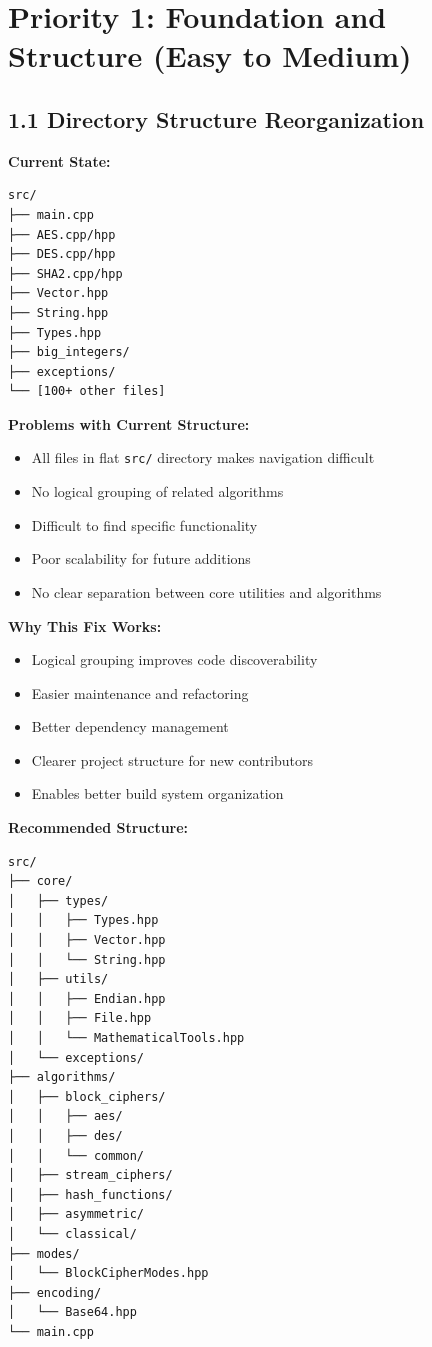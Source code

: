 \documentclass[11pt,a4paper]{article}
\begin{document}
\section{Priority 1: Foundation and Structure (Easy to Medium)}

\subsection{1.1 Directory Structure Reorganization}

\textbf{Current State:}
\begin{lstlisting}
src/
├── main.cpp
├── AES.cpp/hpp
├── DES.cpp/hpp
├── SHA2.cpp/hpp
├── Vector.hpp
├── String.hpp
├── Types.hpp
├── big_integers/
├── exceptions/
└── [100+ other files]
\end{lstlisting}

\textcolor{problemred}{\textbf{Problems with Current Structure:}}
\begin{itemize}
    \item All files in flat \texttt{src/} directory makes navigation difficult
    \item No logical grouping of related algorithms
    \item Difficult to find specific functionality
    \item Poor scalability for future additions
    \item No clear separation between core utilities and algorithms
\end{itemize}

\textcolor{solutiongreen}{\textbf{Why This Fix Works:}}
\begin{itemize}
    \item Logical grouping improves code discoverability
    \item Easier maintenance and refactoring
    \item Better dependency management
    \item Clearer project structure for new contributors
    \item Enables better build system organization
\end{itemize}

\textbf{Recommended Structure:}
\begin{lstlisting}
src/
├── core/
│   ├── types/
│   │   ├── Types.hpp
│   │   ├── Vector.hpp
│   │   └── String.hpp
│   ├── utils/
│   │   ├── Endian.hpp
│   │   ├── File.hpp
│   │   └── MathematicalTools.hpp
│   └── exceptions/
├── algorithms/
│   ├── block_ciphers/
│   │   ├── aes/
│   │   ├── des/
│   │   └── common/
│   ├── stream_ciphers/
│   ├── hash_functions/
│   ├── asymmetric/
│   └── classical/
├── modes/
│   └── BlockCipherModes.hpp
├── encoding/
│   └── Base64.hpp
└── main.cpp
\end{lstlisting}
\end{document}
